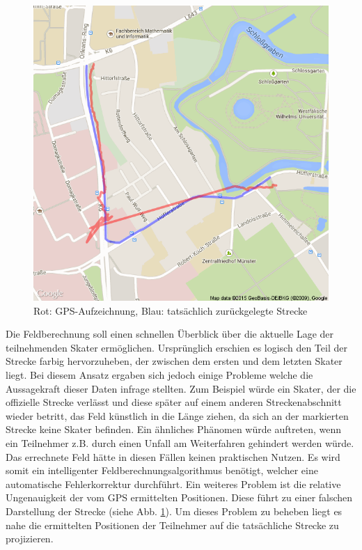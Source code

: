 \begin{figure}[htb]
\centering
\includegraphics[width=\textwidth]{graphics/Feldberechnung.png}
\caption{Rot: GPS-Aufzeichnung, Blau: tatsächlich zurückgelegte Strecke}
\label{fig:feldberechnung}
\end{figure}

Die Feldberechnung soll einen schnellen Überblick über die aktuelle Lage der teilnehmenden Skater ermöglichen. Ursprünglich erschien es logisch den Teil der Strecke farbig hervorzuheben, der zwischen dem ersten und dem letzten Skater liegt. Bei diesem Ansatz ergaben sich jedoch einige Probleme welche die Aussagekraft dieser Daten infrage stellten. Zum Beispiel würde ein Skater, der die offizielle Strecke verlässt und diese später auf einem anderen Streckenabschnitt wieder betritt, das Feld künstlich in die Länge ziehen, da sich an der markierten Strecke keine Skater befinden. Ein ähnliches Phänomen würde auftreten, wenn ein Teilnehmer z.B. durch einen Unfall am Weiterfahren gehindert werden würde. Das errechnete Feld hätte in diesen Fällen keinen praktischen Nutzen. Es wird somit ein intelligenter Feldberechnungsalgorithmus benötigt, welcher eine automatische Fehlerkorrektur durchführt. Ein weiteres Problem ist die relative Ungenauigkeit der vom GPS ermittelten Positionen. Diese führt zu einer falschen Darstellung der Strecke (siehe Abb. \ref{fig:feldberechnung}). Um dieses Problem zu beheben liegt es nahe die ermittelten Positionen der Teilnehmer auf die tatsächliche Strecke zu projizieren.

